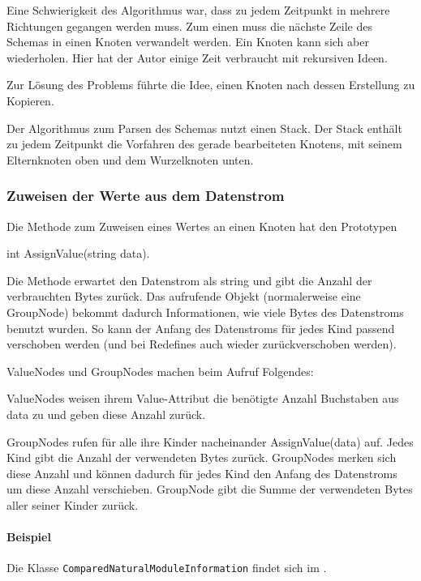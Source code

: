 Eine Schwierigkeit des Algorithmus war, dass zu jedem Zeitpunkt in mehrere Richtungen gegangen werden muss. Zum einen muss die nächste Zeile des Schemas in einen Knoten verwandelt werden. Ein Knoten kann sich aber wiederholen.
Hier hat der Autor einige Zeit verbraucht mit rekursiven Ideen.

Zur Lösung des Problems führte die Idee, einen Knoten nach dessen Erstellung zu Kopieren.

Der Algorithmus zum Parsen des Schemas nutzt einen Stack. Der Stack enthält zu jedem Zeitpunkt die Vorfahren des gerade bearbeiteten Knotens, mit seinem Elternknoten oben und dem Wurzelknoten unten.



\subsubsection{Zuweisen der Werte aus dem Datenstrom}
Die Methode zum Zuweisen eines Wertes an einen Knoten hat den Prototypen 

int AssignValue(string data).

Die Methode erwartet den Datenstrom als string und gibt die Anzahl der verbrauchten Bytes zurück. Das aufrufende Objekt (normalerweise eine GroupNode) bekommt dadurch Informationen, wie viele Bytes des Datenstroms benutzt wurden. So kann der Anfang des Datenstroms für jedes Kind passend verschoben werden (und bei Redefines auch wieder zurückverschoben werden).

ValueNodes und GroupNodes machen beim Aufruf Folgendes:

ValueNodes weisen ihrem Value-Attribut die benötigte Anzahl Buchstaben aus data zu und geben diese Anzahl zurück.


GroupNodes rufen für alle ihre Kinder nacheinander AssignValue(data) auf. Jedes Kind gibt die Anzahl der verwendeten Bytes zurück. GroupNodes merken sich diese Anzahl und können dadurch für jedes Kind den Anfang des Datenstroms um diese Anzahl verschieben. GroupNode gibt die Summe der verwendeten Bytes aller seiner Kinder zurück.

\paragraph{Beispiel}
Die Klasse \texttt{Com\-par\-ed\-Na\-tu\-ral\-Mo\-dule\-In\-for\-ma\-tion} findet sich im .  






